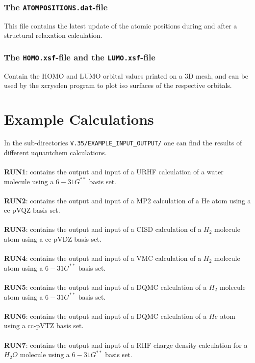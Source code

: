 \documentclass[a4paper,twoside,openany]{book}
\begin{document}
{{\subsection{The \texttt{ATOMPOSITIONS.dat}-file}
This file contains the latest update of the atomic positions during and after a structural relaxation calculation.

\subsection{The \texttt{HOMO.xsf}-file and the \texttt{LUMO.xsf}-file}
Contain the HOMO and LUMO orbital values  printed on a 3D mesh, and can be used by the xcrysden program to plot iso surfaces of the respective orbitals.


\chapter{Example Calculations}
In the sub-directories \texttt{V.35/EXAMPLE\_INPUT\_OUTPUT/} one can find the results of different uquantchem calculations. \\ \\
 {\bf RUN1}: contains the output and input of a URHF calculation of a water molecule using a $6-31G^{**}$ basis set. \\ \\
\noindent
{\bf RUN2}: contains the output and input of a MP2 calculation of a He atom using a cc-pVQZ basis set. \\ \\
\noindent
{\bf RUN3}: contains the output and input of a CISD calculation of a $H_{2}$ molecule atom using a cc-pVDZ basis set. \\ \\
\noindent
{\bf RUN4}: contains the output and input of a VMC calculation of a $H_{2}$ molecule atom using a $6-31G^{**}$ basis set. \\ \\
\noindent
{\bf RUN5}: contains the output and input of a DQMC calculation of a $H_{2}$ molecule atom using a $6-31G^{**}$ basis set. \\ \\
\noindent
{\bf RUN6}: contains the output and input of a DQMC calculation of a $He$ atom using a cc-pVTZ basis set. \\ \\
\noindent
{\bf RUN7}: contains the output and input of a RHF charge density  calculation for a  $H_{2}O$ molecule  using a $6-31G^{**}$ basis set. \\ \\
}}
\end{document}
